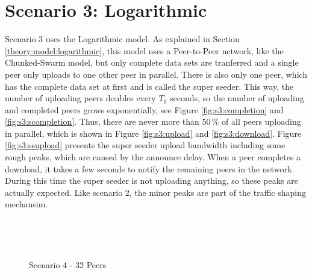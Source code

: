 \pagebreak
\section{Scenario 3: Logarithmic}
\label{evaluation:3}

Scenario 3 uses the Logarithmic model. As explained in Section \ref{theory:model:logarithmic}, this model uses a Peer-to-Peer network, like the Chunked-Swarm model, but only complete data sets are tranferred and a single peer only uploads to one other peer in parallel. There is also only one peer, which has the complete data set at first and is called the super seeder. This way, the number of uploading peers doubles every $T_0$ seconds, so the number of uploading and completed peers grows exponentially, see Figure \ref{fig:s3:completion} and \ref{fig:s3:scompletion}. Thus, there are never more than 50\,\% of all peers uploading in parallel, which is shown in Figure \ref{fig:s3:upload} and \ref{fig:s3:download}. Figure \ref{fig:s3:ssupload} presents the super seeder upload bandwidth including some rough peaks, which are caused by the announce delay. When a peer completes a download, it takes a few seconds to notify the remaining peers in the network. During this time the super seeder is not uploading anything, so these peaks are actually expected. Like scenario 2, the minor peaks are part of the traffic shaping mechansim.

\vfill


\pagebreak
\begin{figure}[!ht]
	\begin{center}	
		~ %

	 	~ %

		\caption{Scenario 4 - 32 Peers}
		\label{fig:s4}
	\end{center}
\end{figure}
\vfill

